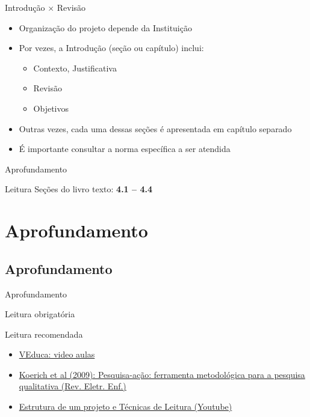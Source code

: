 \documentclass{beamer}
\begin{document}
\begin{frame}{Introdução $\times$ Revisão}
  \begin{itemize}
    \footnotesize
  \item Organização do projeto depende da Instituição
  \bigskip
  \item Por vezes, a Introdução (seção ou capítulo) inclui:
    \begin{itemize}
      \scriptsize
    \item Contexto, Justificativa
    \item Revisão
    \item Objetivos
    \end{itemize}
  \bigskip
  \item Outras vezes, cada uma dessas seções é apresentada em capítulo
    separado
  \bigskip
  \item É importante \alert{consultar} a norma \alert{específica} a
    ser atendida
  \end{itemize}
\end{frame}

\begin{frame}{Aprofundamento}
  \begin{block}{Leitura}
    Seções do livro texto: {\bf 4.1 -- 4.4}
  \end{block}
\end{frame}

\section{Aprofundamento}

\subsection{Aprofundamento}

\begin{frame}{Aprofundamento}
  \begin{block}{Leitura obrigatória}
  \end{block}
  \begin{block}{Leitura recomendada}
    \begin{itemize}
      \scriptsize
    \item<1-> \href{http://www.veduca.com.br/assistir/metodologia-cientifica}
      {VEduca: video aulas}
    \item<1-> \href{http://www.veduca.com.br/assistir/metodologia-cientifica}
      {Koerich et al (2009): Pesquisa-ação: ferramenta
      metodológica para a pesquisa qualitativa (Rev. Eletr. Enf.)}
  \item<1-> \href{http://www.veduca.com.br/assistir/metodologia-cientifica}
    {Estrutura de um projeto e Técnicas de Leitura (Youtube)}
    \end{itemize}
  \end{block}
\end{frame}
\end{document}
